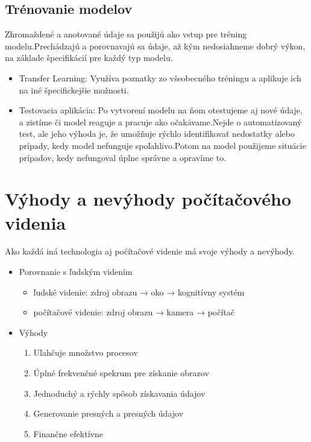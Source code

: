 \documentclass[10pt,twoside,slovak,a4paper]{coursepaper}
\begin{document}
\subsection{Trénovanie modelov} \label{ina:nejako}
Zhromaždené a anotované údaje sa použijú ako vstup pre tréning modelu.Prechádzajú a porovnavajú sa údaje, až kým nedosiahneme dobrý výkon, na základe špecifikácií pre každý typ modelu.

\begin{itemize}
\item Transfer Learning: Využíva poznatky zo všeobecného tréningu a aplikuje ich na iné špecifickejšie možnosti.
\item Testovacia aplikácia: Po vytvorení modelu na ňom otestujeme aj nové údaje, a zistíme či model reaguje a pracuje ako očakávame.Nejde o automatizovaný test, ale jeho výhoda je, že umožňuje rýchlo identifikovať nedostatky alebo prípady, kedy model nefunguje spoľahlivo.Potom na model použijeme situácie prípadov, kedy nefungoval úplne správne a opravíme to.
\end{itemize} 
\cite{CV-Framework}

\centering




\section{Výhody a nevýhody počítačového videnia} \label{ina}
Ako každá iná technologia aj počítačové videnie má svoje výhody a nevýhody.
\begin{itemize}
\item Porovnanie s ľudským videním
	\begin{itemize}
	\item ľudské videnie: zdroj obrazu → oko → kognitívny systém
	\item počítačové videnie: zdroj obrazu → kamera → počítač
	\end{itemize}
\end{itemize}

\begin{itemize}
\item Výhody
	\begin{enumerate}
	\item Uľahčuje množstvo procesov
	\item Úplné frekvenčné spekrum pre získanie obrazov
	\item Jednoduchý a rýchly spôsob získavania údajov
	\item Generovanie presných a presných údajov
	\item Finančne efektívne
	\end{enumerate}
\end{itemize}
\end{document}
